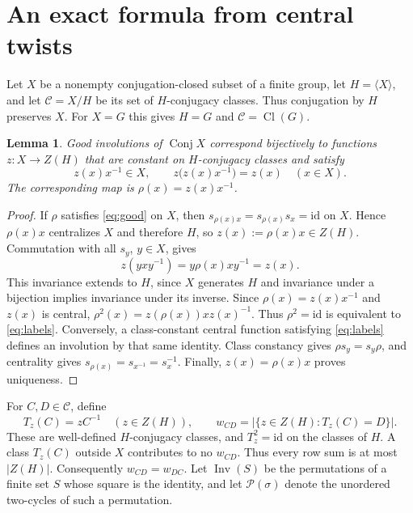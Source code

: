 \documentclass[11pt]{article}
\newtheorem{lemma}[theorem]{Lemma}
\newcommand{\Conj}{\operatorname{Conj}}
\newcommand{\Cl}{\operatorname{Cl}}
\newcommand{\Inv}{\operatorname{Inv}}
\begin{document}
\section{An exact formula from central twists}
Let $X$ be a nonempty conjugation-closed subset of a finite group, let
$H=\langle X\rangle$, and let $\mathcal C=X/H$ be its set of
$H$-conjugacy classes. Thus conjugation by $H$ preserves $X$.
For $X=G$ this gives $H=G$ and $\mathcal C=\Cl(G)$.
\begin{lemma}\label{lem:labels}
Good involutions of $\Conj X$ correspond bijectively to functions
$z:X\to Z(H)$ that are constant on $H$-conjugacy classes and satisfy
\begin{equation}\label{eq:labels}
 z(x)x^{-1}\in X,\qquad z\bigl(z(x)x^{-1}\bigr)=z(x)\quad(x\in X).
\end{equation}
The corresponding map is $\rho(x)=z(x)x^{-1}$.
\end{lemma}
\begin{proof}
If $\rho$ satisfies \eqref{eq:good} on $X$, then
$s_{\rho(x)x}=s_{\rho(x)}s_x=\mathrm{id}$ on $X$. Hence
$\rho(x)x$ centralizes $X$ and therefore $H$, so
$z(x):=\rho(x)x\in Z(H)$. Commutation with all $s_y$, $y\in X$, gives
\[
 z(yxy^{-1})=y\rho(x)xy^{-1}=z(x).
\]
This invariance extends to $H$, since $X$ generates $H$ and invariance
under a bijection implies invariance under its inverse.
Since $\rho(x)=z(x)x^{-1}$ and $z(x)$ is central,
$\rho^2(x)=z(\rho(x))xz(x)^{-1}$. Thus $\rho^2=\mathrm{id}$ is
equivalent to \eqref{eq:labels}. Conversely, a class-constant central
function satisfying \eqref{eq:labels} defines an involution by that same
identity. Class constancy gives $\rho s_y=s_y\rho$, and centrality gives
$s_{\rho(x)}=s_{x^{-1}}=s_x^{-1}$. Finally, $z(x)=\rho(x)x$ proves uniqueness.
\end{proof}

For $C,D\in\mathcal C$, define
\begin{equation}\label{eq:weights}
 T_z(C)=zC^{-1}\quad(z\in Z(H)),\qquad
 w_{CD}=|\{z\in Z(H):T_z(C)=D\}|.
\end{equation}
These are well-defined $H$-conjugacy classes, and $T_z^2=\mathrm{id}$
on the classes of $H$. A class $T_z(C)$ outside $X$ contributes to no
$w_{CD}$. Thus every row sum is at most $|Z(H)|$.
Consequently $w_{CD}=w_{DC}$. Let $\Inv(S)$ be the permutations of a finite
set $S$ whose square is the identity, and let $\mathcal P(\sigma)$ denote
the unordered two-cycles of such a permutation.
\end{document}

